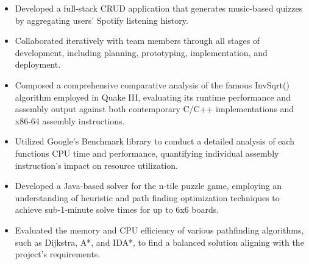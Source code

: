 \documentclass[10pt,a4paper,ragged2e,withhyper]{altacv}
\begin{document}
\begin{paracol}{2}
        \vspace{-2em}
            \vspace{-0.5em}
            \begin{itemize}
            \item Developed a full-stack CRUD application that generates music-based quizzes by aggregating users’ Spotify listening history.
            \item Collaborated iteratively with team members through all stages of development, including planning, prototyping, implementation, and deployment.
            \end{itemize}
            \vspace{-0.5em}
            \divider
            \vspace{0.5em}
            
            \vspace{-0.5em}
            \begin{itemize}
            \item Composed a comprehensive comparative analysis of the famous InvSqrt() algorithm employed in Quake III, evaluating its runtime performance and assembly output against both contemporary C/C++ implementations and x86-64 assembly instructions.
            \item Utilized Google's Benchmark library to conduct a detailed analysis of each functions CPU time and performance, quantifying individual assembly instruction's impact on resource utilization.
            \end{itemize}
            \vspace{-0.5em}
            \divider
            \vspace{0.5em}
            \vspace{-0.5em}
            \begin{itemize}
            \item Developed a Java-based solver for the n-tile puzzle game, employing an understanding of heuristic and path finding optimization techniques to achieve sub-1-minute solve times for up to 6x6 boards.
            \item Evaluated the memory and CPU efficiency of various pathfinding algorithms, such as Dijkstra, A*, and IDA*, to find a balanced solution aligning with the project's requirements.
            \end{itemize}
        

\end{paracol}
\end{document}
